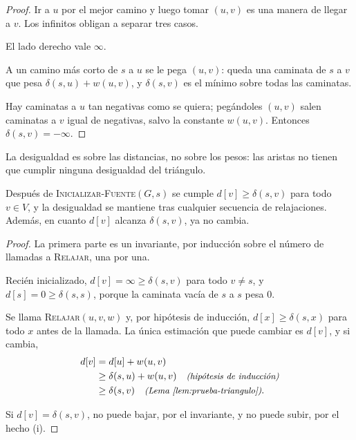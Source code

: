 \documentclass[11pt,letterpaper]{article}
\begin{document}
\begin{proof}
  Ir a $u$ por el mejor camino y luego tomar $(u, v)$ es una manera de
  llegar a $v$. Los infinitos obligan a separar tres casos.

   El lado derecho vale $\infty$.

   A un camino más corto de $s$ a $u$ se
  le pega $(u, v)$: queda una caminata de $s$ a $v$ que pesa
  $\delta(s, u) + w(u, v)$, y $\delta(s, v)$ es el mínimo sobre todas
  las caminatas.

   Hay caminatas a $u$ tan negativas
  como se quiera; pegándoles $(u, v)$ salen caminatas a $v$ igual de
  negativas, salvo la constante $w(u, v)$. Entonces
  $\delta(s, v) = -\infty$.
\end{proof}

La desigualdad es sobre las distancias, no sobre los pesos: las
aristas no tienen que cumplir ninguna desigualdad del triángulo.

\begin{lema}
  \label{lem:prueba-cota-superior}
  Después de \textsc{Inicializar-Fuente}$(G, s)$ se cumple
  $d[v] \ge \delta(s, v)$ para todo $v \in V$, y la desigualdad se
  mantiene tras cualquier secuencia de relajaciones. Además, en cuanto
  $d[v]$ alcanza $\delta(s, v)$, ya no cambia.
\end{lema}

\begin{proof}
  La primera parte es un invariante, por inducción sobre el número de
  llamadas a \textsc{Relajar}, una por una.

   Recién inicializado, $d[v] = \infty \ge \delta(s, v)$
  para todo $v \ne s$, y $d[s] = 0 \ge \delta(s, s)$, porque la
  caminata vacía de $s$ a $s$ pesa $0$.

   Se llama \textsc{Relajar}$(u, v, w)$ y, por
  hipótesis de inducción, $d[x] \ge \delta(s, x)$ para todo $x$ antes
  de la llamada. La única estimación que puede cambiar es $d[v]$, y si
  cambia,
  \begin{align*}
    d[v] &= d[u] + w(u, v) \\
         &\ge \delta(s, u) + w(u, v)
           \quad\text{\small\itshape (hipótesis de inducción)} \\
         &\ge \delta(s, v)
           \quad\text{\small\itshape (Lema \ref{lem:prueba-triangulo})} .
  \end{align*}

   Si $d[v] = \delta(s, v)$, no
  puede bajar, por el invariante, y no puede subir, por el hecho (i).
\end{proof}
\end{document}
